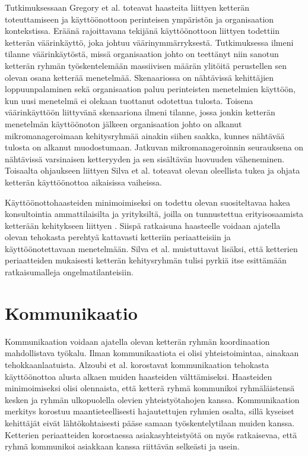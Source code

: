 Tutkimuksessaan Gregory et al. \cite{GREGORY201692} toteavat haasteita liittyen ketterän toteuttamiseen ja käyttöönottoon perinteisen ympäristön ja organisaation kontekstissa. Eräänä rajoittavana tekijänä käyttöönottoon liittyen todettiin ketterän väärinkäyttö, joka johtuu väärinymmärryksestä. Tutkimuksessa ilmeni tilanne väärinkäytöstä, missä organisaation johto on teettänyt niin sanotun ketterän ryhmän työskentelemään massiivisen määrän ylitöitä perustellen sen olevan osana ketterää menetelmää. Skenaariossa on nähtävissä kehittäjien loppuunpalaminen sekä organisaation paluu perinteisten menetelmien käyttöön, kun uusi menetelmä ei olekaan tuottanut odotettua tulosta. Toisena väärinkäyttöön liittyvänä skenaariona ilmeni tilanne, jossa jonkin ketterän menetelmän käyttöönoton jälkeen organisaation johto on alkanut mikromanageroimaan kehitysryhmää ainakin siihen saakka, kunnes nähtävää tulosta on alkanut muodostumaan. Jatkuvan mikromanageroinnin seurauksena on nähtävissä varsinaisen ketteryyden ja sen sisältävän luovuuden väheneminen. Toisaalta ohjaukseen liittyen Silva et al. \cite{SELLERISILVA201520} toteavat olevan oleellista tukea ja ohjata ketterän käyttöönottoa aikaisissa vaiheissa.

Käyttöönottohaasteiden minimoimiseksi on todettu olevan suositeltavaa hakea konsultointia ammattilaisilta ja yrityksiltä, joilla on tunnustettua erityisosaamista ketterään kehitykseen liittyen \cite{SELLERISILVA201520}. Siispä ratkaisuna haasteelle voidaan ajatella olevan tehokasta perehtyä kattavasti ketteriin periaatteisiin ja käyttöönotettavaan menetelmään. Silva et al. \cite{SELLERISILVA201520} muistuttavat lisäksi, että ketterien periaatteiden mukaisesti ketterän kehitysryhmän tulisi pyrkiä itse esittämään ratkaisumalleja ongelmatilanteisiin.

\section{Kommunikaatio}

Kommunikaation voidaan ajatella olevan ketterän ryhmän koordinaation mahdollistava työkalu. Ilman kommunikaatiota ei olisi yhteistoimintaa, ainakaan tehokkaanlaatuista. Alzoubi et al. \cite{ALZOUBI201622} korostavat kommunikaation tehokasta käyttöönottoa alusta alkaen muiden haasteiden välttämiseksi. Haasteiden minimoimiseksi olisi olennaista, että ketterä ryhmä kommunikoi ryhmäläistensä kesken ja ryhmän ulkopuolella olevien yhteistyötahojen kanssa. Kommunikaation merkitys korostuu maantieteellisesti hajautettujen ryhmien osalta, sillä kyseiset kehittäjät eivät lähtökohtaisesti pääse samaan työskentelytilaan muiden kanssa. Ketterien periaatteiden korostaessa asiakasyhteistyötä on myös ratkaisevaa, että ryhmä kommunikoi asiakkaan kanssa riittävän selkeästi ja usein.

